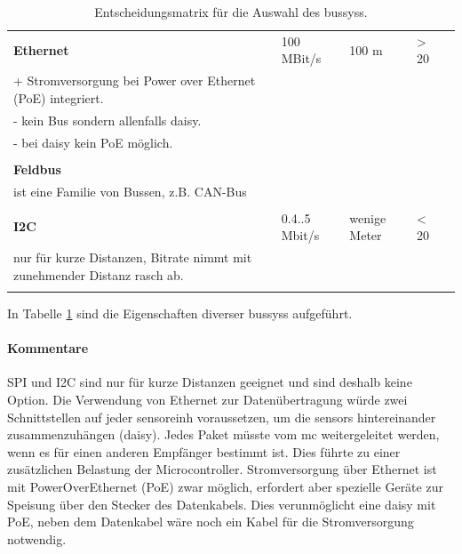\begin{table}
\begin{tabular}{|l|l|l|l|l|}
\begin{minipage}{6cm}
\end{minipage} \\ 
\hline \textbf{Ethernet} & 100 MBit/s & 100 m & > 20 & \begin{minipage}{6cm}
\mbox{ }\\+ Stromversorgung bei Power over Ethernet (PoE) integriert.\\
- kein Bus sondern allenfalls \gls{daisy}.\\
- bei \gls{daisy} kein PoE möglich.\\
\end{minipage} \\ 
\hline \textbf{Feldbus} &  &  &  & \begin{minipage}{6cm}
\mbox{ }\\ist eine Familie von Bussen, z.B. CAN-Bus\\
\end{minipage} \\ 
\hline \textbf{I2C} & 0.4..5 Mbit/s & wenige Meter & < 20 & \begin{minipage}{6cm}
\mbox{ }\\nur für kurze Distanzen, Bitrate nimmt mit zunehmender Distanz rasch ab.\\
\end{minipage}\\
\hline 
\end{tabular}
\caption{Entscheidungsmatrix für die Auswahl des \gls{bussys}s.}
\label{table.bussystem}
\end{table} 

In Tabelle \ref{table.bussystem} sind die Eigenschaften diverser \glspl{bussys} aufgeführt.

\paragraph{Kommentare}
SPI und I2C sind nur für kurze Distanzen geeignet und sind deshalb keine Option.
Die Verwendung von Ethernet zur Datenübertragung würde zwei Schnittstellen auf jeder \gls{sensoreinh} voraussetzen, um die \glspl{sensor} hintereinander zusammenzuhängen (\gls{daisy}). Jedes Paket müsste vom \gls{mc} weitergeleitet werden, wenn es für einen anderen Empfänger bestimmt ist. Dies führte zu einer zusätzlichen Belastung der Microcontroller. Stromversorgung über Ethernet ist mit PowerOverEthernet (PoE) zwar möglich, erfordert aber spezielle Geräte zur Speisung über den Stecker des Datenkabels. Dies verunmöglicht eine \gls{daisy} mit PoE, neben dem Datenkabel wäre noch ein Kabel für die Stromversorgung notwendig.

